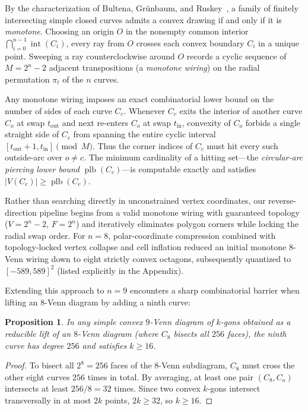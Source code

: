 \documentclass[11pt]{article}
\newtheorem{proposition}{Proposition}
\begin{document}
By the characterization of Bultena, Gr\"unbaum, and Ruskey~\cite{BGR1999}, a family of finitely intersecting simple closed curves admits a convex drawing if and only if it is \emph{monotone}. Choosing an origin $O$ in the nonempty common interior $\bigcap_{i=0}^{n-1} \operatorname{int}(C_i)$, every ray from $O$ crosses each convex boundary $C_i$ in a unique point. Sweeping a ray counterclockwise around $O$ records a cyclic sequence of $M = 2^n - 2$ adjacent transpositions (a \emph{monotone wiring}) on the radial permutation $\pi_t$ of the $n$ curves.

Any monotone wiring imposes an exact combinatorial lower bound on the number of sides of each curve $C_c$. Whenever $C_c$ exits the interior of another curve $C_o$ at swap $t_{\text{out}}$ and next re-enters $C_o$ at swap $t_{\text{in}}$, convexity of $C_o$ forbids a single straight side of $C_c$ from spanning the entire cyclic interval $[t_{\text{out}}+1, t_{\text{in}}] \pmod M$. Thus the corner indices of $C_c$ must hit every such outside-arc over $o \ne c$. The minimum cardinality of a hitting set—the \emph{circular-arc piercing lower bound} $\operatorname{plb}(C_c)$—is computable exactly and satisfies $|V(C_c)| \ge \operatorname{plb}(C_c)$.

Rather than searching directly in unconstrained vertex coordinates, our reverse-direction pipeline begins from a valid monotone wiring with guaranteed topology ($V = 2^n - 2$, $F = 2^n$) and iteratively eliminates polygon corners while locking the radial swap order. For $n=8$, polar-coordinate compression combined with topology-locked vertex collapse and cell inflation reduced an initial monotone $8$-Venn wiring down to eight strictly convex octagons, subsequently quantized to $[-589, 589]^2$ (listed explicitly in the Appendix).

Extending this approach to $n=9$ encounters a sharp combinatorial barrier when lifting an $8$-Venn diagram by adding a ninth curve:

\begin{proposition}\label{prop:reducible}
In any simple convex $9$-Venn diagram of $k$-gons obtained as a reducible lift of an $8$-Venn diagram (where $C_8$ bisects all $256$ faces), the ninth curve has degree $256$ and satisfies $k \ge 16$.
\end{proposition}
\begin{proof}
To bisect all $2^8 = 256$ faces of the $8$-Venn subdiagram, $C_8$ must cross the other eight curves $256$ times in total. By averaging, at least one pair $(C_8, C_o)$ intersects at least $256 / 8 = 32$ times. Since two convex $k$-gons intersect transversally in at most $2k$ points, $2k \ge 32$, so $k \ge 16$.
\end{proof}
\end{document}
